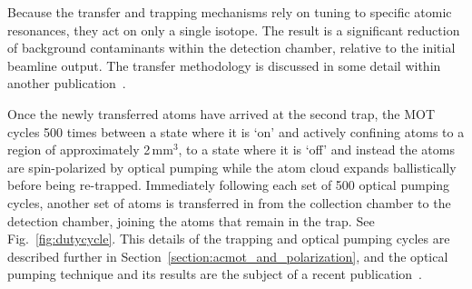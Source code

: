 Because the transfer and trapping mechanisms rely on tuning to specific atomic resonances, they act on only a single isotope.  The result is a significant reduction of background contaminants within the detection chamber, relative to the initial beamline output.  
The transfer methodology is discussed in some detail within another publication~\cite{swanson}.




Once the newly transferred atoms have arrived at the second trap, the MOT cycles 500 times between a state where it is `on' and actively confining atoms to a region of approximately 2\,mm$^3$, to a state where it is `off' and instead the atoms are spin-polarized by optical pumping while the atom cloud expands ballistically before being re-trapped.  Immediately following each set of 500 optical pumping cycles, another set of atoms is transferred in from the collection chamber to the detection chamber, joining the atoms that remain in the trap.  See Fig.~\ref{fig:dutycycle}.  This details of the trapping and optical pumping cycles are described further in Section~\ref{section:acmot_and_polarization}, and the optical pumping technique and its results are the subject of a recent publication~\cite{ben_OP}.

